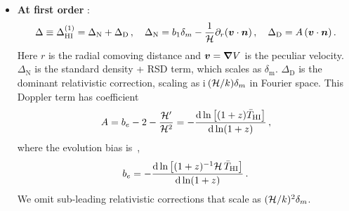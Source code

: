 \begin{itemize}
\item 
{\bfseries At first order} \cite{Hall:2012wd}:
\begin{equation} \label{dt1}
\Delta \equiv \Delta^{(1)}_{{\mathrm{HI}}} = \Delta_\mathrm{N} + \Delta_\mathrm{D}\,,\quad  \Delta_\mathrm{N} = b_1\delta_m - \frac{1}{\mathcal{H}} \partial_r(\bm{v}\cdot\bm {n} )\,,\quad \Delta_\mathrm{D}=A\,(\bm{v}\cdot\bm {n} ) \,.
\end{equation}
Here $r$ is the radial comoving distance and $\bm{v}=\bm{\nabla}V$ is the peculiar velocity.
$ \Delta_\mathrm{N}$ is the standard density + RSD term, which scales as $\delta_\mathrm{m}$. $\Delta_\mathrm{D}$ is the dominant relativistic correction, scaling as i\,$(\mathcal{H}/k)\delta_m$ in Fourier space. This Doppler term has coefficient
\begin{equation}
A = b_e - 2 - \frac{\mathcal{H}'}{\mathcal{H}^{2}}= -\frac{\mathrm{d} \ln \left[(1+z) \bar{T}_{{\mathrm{HI}}} \right]}{\mathrm{d} \ln (1+z)} \,,
 \label{eq:AcoeffTrel}
\end{equation}
where the evolution bias is~\cite{Fonseca:2015laa},
\begin{equation}
b_e = -\frac{\mathrm{d} \ln \left[(1+z)^{-1}\mathcal{H}\, \bar{T}_{{\mathrm{HI}}} \right]}{\mathrm{d} \ln (1+z)}\,.
\end{equation}
We omit sub-leading relativistic corrections that scale as $(\mathcal{H}/k)^2\delta_m$. 



\end{itemize}
